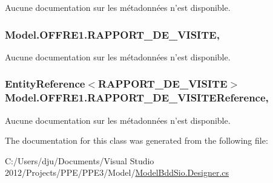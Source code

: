 Aucune documentation sur les métadonnées n'est disponible. 

\hypertarget{class_model_1_1_o_f_f_r_e1_a87de6d87e3506d3826f5585b401137a0}{
\subsubsection[{R\-A\-P\-P\-O\-R\-T\-\_\-\-D\-E\-\_\-\-V\-I\-S\-I\-T\-E}]{ Model.\-O\-F\-F\-R\-E1.\-R\-A\-P\-P\-O\-R\-T\-\_\-\-D\-E\-\_\-\-V\-I\-S\-I\-T\-E\hspace{0.3cm}{\ttfamily [get]}, {\ttfamily [set]}}}\label{class_model_1_1_o_f_f_r_e1_a87de6d87e3506d3826f5585b401137a0}


Aucune documentation sur les métadonnées n'est disponible. 

\hypertarget{class_model_1_1_o_f_f_r_e1_a8234673a832a8f053a56a13434e9f664}{
\subsubsection[{R\-A\-P\-P\-O\-R\-T\-\_\-\-D\-E\-\_\-\-V\-I\-S\-I\-T\-E\-Reference}]{\setlength{\rightskip}{0pt plus 5cm}Entity\-Reference$<${\bf R\-A\-P\-P\-O\-R\-T\-\_\-\-D\-E\-\_\-\-V\-I\-S\-I\-T\-E}$>$ Model.\-O\-F\-F\-R\-E1.\-R\-A\-P\-P\-O\-R\-T\-\_\-\-D\-E\-\_\-\-V\-I\-S\-I\-T\-E\-Reference\hspace{0.3cm}{\ttfamily [get]}, {\ttfamily [set]}}}\label{class_model_1_1_o_f_f_r_e1_a8234673a832a8f053a56a13434e9f664}


Aucune documentation sur les métadonnées n'est disponible. 



The documentation for this class was generated from the following file\-:\begin{DoxyCompactItemize}
\item 
C\-:/\-Users/dju/\-Documents/\-Visual Studio 2012/\-Projects/\-P\-P\-E/\-P\-P\-E3/\-Model/\hyperlink{_model_bdd_sio_8_designer_8cs}{Model\-Bdd\-Sio.\-Designer.\-cs}\end{DoxyCompactItemize}
